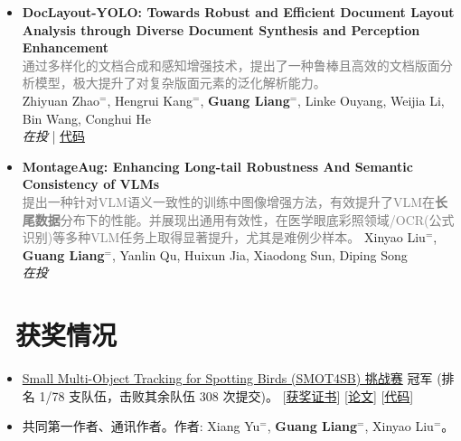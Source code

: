 \documentclass[10pt]{resume}
\begin{document}
\begin{itemize}[leftmargin=*, parsep=0.5ex]
    \item \textbf{DocLayout-YOLO: Towards Robust and Efficient Document Layout Analysis through Diverse Document Synthesis and Perception Enhancement} \\
    [0.2em]
        \textcolor{gray}{\small{通过多样化的文档合成和感知增强技术，提出了一种鲁棒且高效的文档版面分析模型，极大提升了对复杂版面元素的泛化解析能力。}} \\
          \small{
          Zhiyuan Zhao$^{=}$, Hengrui Kang$^{=}$, \textbf{Guang Liang}$^{=}$, Linke Ouyang, Weijia Li, Bin Wang, Conghui He \\
          \textit{在投} |
          \href{https://github.com/opendatalab/DocLayout-YOLO}{代码}
          }

    \item \textbf{MontageAug: Enhancing Long-tail Robustness And Semantic Consistency of VLMs} \\
    [0.2em]
        \textcolor{gray}{\small{提出一种针对VLM语义一致性的训练中图像增强方法，有效提升了VLM在\textbf{长尾数据}分布下的性能。并展现出通用有效性，在医学眼底彩照领域/OCR(公式识别)等多种VLM任务上取得显著提升，尤其是难例少样本。}} 
          \small{Xinyao Liu$^{=}$, \textbf{Guang Liang}$^{=}$, Yanlin Qu, Huixun Jia, Xiaodong Sun, Diping Song \\
          \textit{在投}
          }
\end{itemize}

\section{\faTrophy\ 获奖情况}
\small{
\begin{itemize}[parsep=0.5ex]
    \item \href{https://www.mva-org.jp/mva2025/challenge/challenge}{Small Multi-Object Tracking for Spotting Birds (SMOT4SB) 挑战赛} 冠军 (排名 1/78 支队伍，击败其余队伍 308 次提交)。
    [\href{https://www.mva-org.jp/mva2025/challenge/challenge_winner}{获奖证书}] [\href{https://arxiv.org/abs/2507.12087}{论文}] [\href{https://github.com/Salvatore-Love/YOLOv8-SMOT}{代码}]
    \item 共同第一作者、通讯作者。作者: Xiang Yu$^{=}$, \textbf{Guang Liang}$^{=}$, Xinyao Liu$^{=}$。
\end{itemize}
}
\end{document}
